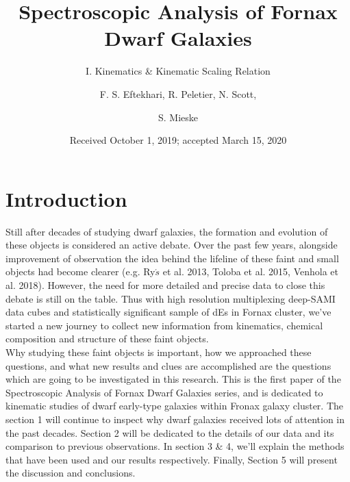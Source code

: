 \documentclass{aa}
\begin{document}
 


   \title{Spectroscopic Analysis of Fornax Dwarf Galaxies}

   \subtitle{I. Kinematics \& Kinematic Scaling Relation}

   \author{F. S. Eftekhari, R. Peletier,  N. Scott, \and S. Mieske}


   \date{Received October 1, 2019; accepted March 15, 2020}

 
  \abstract
   {\bigskip}
   {\bigskip}
   {\bigskip}
   {\bigskip}
   {}

   \keywords{\bigskip}

   \maketitle
%

\section{Introduction}

   Still after decades of studying dwarf galaxies, the formation and evolution of these objects is considered an active debate. Over the past few years, alongside improvement of observation the idea behind the lifeline of these faint and small objects had become clearer (e.g. Ry$\acute{s}$ et al. 2013, Toloba et al. 2015, Venhola et al. 2018). However, the need for more detailed and precise data to close this debate is still on the table. Thus with high resolution multiplexing deep-SAMI data cubes and statistically significant sample of dEs in Fornax cluster, we've started a new journey to collect new information from kinematics, chemical composition and structure of these faint objects. \\Why studying these faint objects is important, how we approached these questions, and what new results and clues are accomplished are the questions which are going to be investigated in this research. This is the first paper of the Spectroscopic Analysis of Fornax Dwarf Galaxies series, and is dedicated to kinematic studies of dwarf early-type galaxies within Fronax galaxy cluster. The section 1 will continue to inspect why dwarf galaxies received lots of attention in the past decades. Section 2 will be dedicated to the details of our data and its comparison to previous observations. In section 3 \& 4, we'll explain the methods that have been used and our results respectively. Finally, Section 5 will present the discussion and conclusions.   
\end{document}
